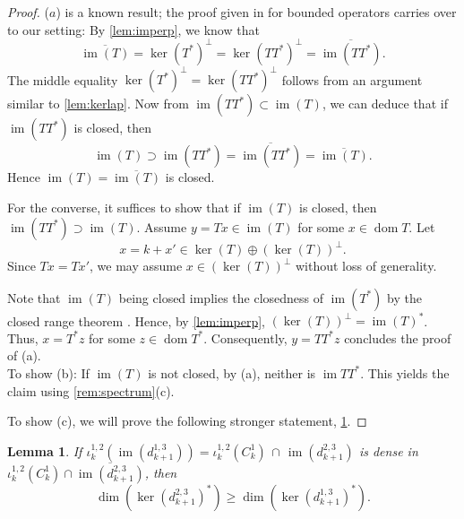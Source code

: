 \documentclass[11pt]{article}
\newtheorem{lemma}[theorem]{Lemma}
\theoremstyle{definition}
\theoremstyle{remark}
\DeclareMathOperator\dom{dom}
\DeclareMathOperator{\im}{im}
\begin{document}
\begin{proof}
($a$) is a known result; the proof given in \citet{closedrange} for bounded operators carries over to our setting: By \cref{lem:imperp}, we know that
$$
\overline{\im(T)}=\ker(T^*)^\perp=\ker\left(T T^*\right)^\perp=\overline{\im\left(T T^*\right)}.
$$
The middle equality $\ker(T^*)^\perp=\ker\left(T T^*\right)^\perp$ follows from an argument similar to \cref{lem:kerlap}. Now from $\im\left(TT^*\right)\subset\im(T)$, we can deduce that if $\im\left(T T^*\right)$ is closed, then
$$
\im(T) \supset \im\left(T T^*\right)=\overline{\im\left(T T^*\right)}=\overline{\im(T)}.
$$
Hence $\im(T)=\overline{\im(T)}$ is closed.

For the converse, it suffices to show that if $\im(T)$ is closed, then $\im\left(T T^*\right)\supset\im(T).$ Assume $y=Tx\in \im (T)$ for some $x\in \dom T$. Let
$$x=k+x' \in \ker(T) \oplus (\ker(T))^\perp.$$
Since $T x=T x'$, we may assume $x\in(\ker(T))^\perp$ without loss of generality. 

Note that $\im(T)$ being closed implies the closedness of $\im(T^*)$ by the closed range theorem \citep[\S5.3]{yosida}. Hence, by \cref{lem:imperp}, $(\ker(T))^\perp=\im(T)^*$. Thus, $x=T^*z$ for some $z\in \dom T^*$. Consequently, $y=T T^*z$ concludes the proof of (a).\\

To show (b): If $\im(T)$ is not closed, by (a), neither is $\im TT^*$. This yields the claim using \cref{rem:spectrum}(c).

To show (c), we will prove the following stronger statement, \cref{lem:imdensedone}.
\end{proof}

\begin{lemma} \label{lem:imdensedone}
    If $\iota_k^{1,2} (\im(d_{k+1}^{1,3}))= \iota_k^{1,2} (C_k^1) \, \cap \, \im(d_{k+1}^{2,3})$ is dense in $\iota_k^{1,2} (C_k^1) \cap \overline{\im(d_{k+1}^{2,3})}$, then $$\dim(\ker(d_{k+1}^{2,3})^*) \ge \dim(\ker(d_{k+1}^{1,3})^*).$$
\end{lemma}
\end{document}
